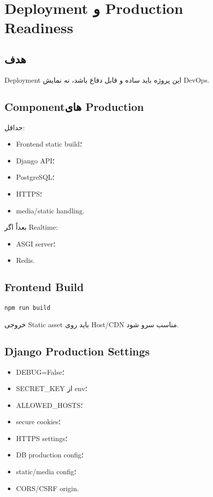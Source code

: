 
\chapter{Deployment و Production Readiness}

\section{هدف}

Deployment این پروژه باید ساده و قابل دفاع باشد، نه نمایش DevOps.

\section{Componentهای Production}

حداقل:
\begin{itemize}
  \item Frontend static build؛
  \item Django API؛
  \item PostgreSQL؛
  \item HTTPS؛
  \item media/static handling.
\end{itemize}

بعداً اگر Realtime:
\begin{itemize}
  \item ASGI server؛
  \item Redis.
\end{itemize}

\section{Frontend Build}

\begin{latin}
\begin{lstlisting}
npm run build
\end{lstlisting}
\end{latin}

خروجی Static asset باید روی Host/CDN مناسب سرو شود.

\section{Django Production Settings}

\begin{itemize}
  \item DEBUG=False؛
  \item SECRET\_KEY از env؛
  \item ALLOWED\_HOSTS؛
  \item secure cookies؛
  \item HTTPS settings؛
  \item DB production config؛
  \item static/media config؛
  \item CORS/CSRF origin.
\end{itemize}

